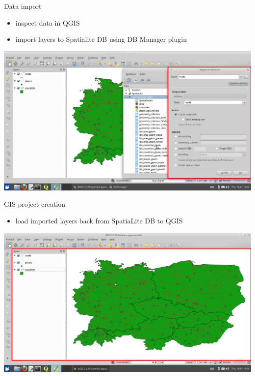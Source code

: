 \documentclass[12pt]{beamer}
\begin{document}
\begin{frame}{Data import}
	\begin{itemize}
		\item inspect data in QGIS
		\item import layers to Spatialite DB using DB Manager plugin
	\end{itemize}
	\begin{center}
		\includegraphics[keepaspectratio=true,height=0.6\textheight]{images/rapid-gis-deployment/project-db-import-layers.png}
	\end{center}
\end{frame}


\begin{frame}{GIS project creation}
	\begin{itemize}
		\item load imported layers back from SpatiaLite DB to QGIS
	\end{itemize}
	\begin{center}
		\includegraphics[keepaspectratio=true,height=0.6\textheight]{images/rapid-gis-deployment/project-db-load-layers.png}
	\end{center}
\end{frame}
\end{document}
